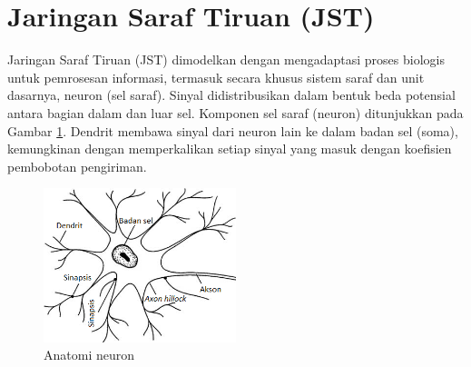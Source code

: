 


\section{Jaringan Saraf Tiruan (JST)}
Jaringan Saraf Tiruan (JST) dimodelkan dengan mengadaptasi proses biologis untuk pemrosesan informasi, termasuk secara khusus sistem saraf dan unit dasarnya, neuron (sel saraf). Sinyal didistribusikan dalam bentuk beda potensial antara bagian dalam dan luar sel. Komponen sel saraf (neuron) ditunjukkan pada Gambar \ref{fig:3:neuron}. Dendrit membawa sinyal dari neuron lain ke dalam badan sel (soma), kemungkinan dengan memperkalikan setiap sinyal yang masuk dengan koefisien pembobotan pengiriman. \cite{NNControlBook}

\begin{figure}[!h]
	\centering
	\includegraphics[width=0.5\textwidth]{figures/neuron}
	\caption{Anatomi neuron \cite{NNControlBook}}
	\label{fig:3:neuron}
\end{figure}

